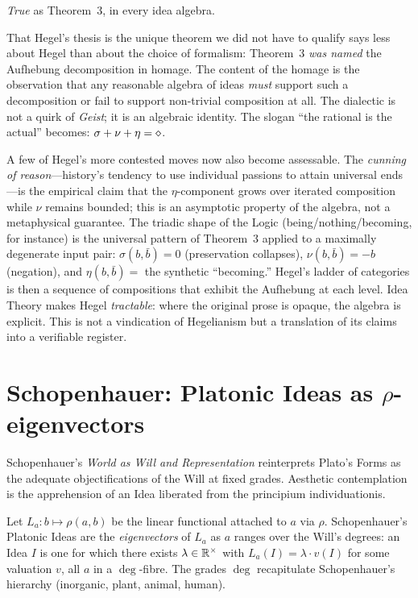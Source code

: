 \formalstatus \emph{True} as Theorem~3, in every idea algebra.

\litcomment That Hegel's thesis is the unique theorem we did not have to
qualify says less about Hegel than about the choice of formalism:
Theorem~3 \emph{was named} the Aufhebung decomposition in homage. The
content of the homage is the observation that any reasonable algebra of
ideas \emph{must} support such a decomposition or fail to support
non-trivial composition at all. The dialectic is not a quirk of
\emph{Geist}; it is an algebraic identity. The slogan ``the rational is
the actual'' becomes: $\sigma + \nu + \eta = \mathbin{\diamond}$.

A few of Hegel's more contested moves now also become assessable.
The \emph{cunning of reason}---history's tendency to use individual
passions to attain universal ends---is the empirical claim that the
$\eta$-component grows over iterated composition while $\nu$ remains
bounded; this is an asymptotic property of the algebra, not a
metaphysical guarantee. The triadic shape of the Logic
(being/nothing/becoming, for instance) is the universal pattern of
Theorem~3 applied to a maximally degenerate input pair: $\sigma(b,
\bar b) = 0$ (preservation collapses), $\nu(b, \bar b) = -b$
(negation), and $\eta(b, \bar b) = $ the synthetic ``becoming.''
Hegel's ladder of categories is then a sequence of compositions that
exhibit the Aufhebung at each level. Idea Theory makes Hegel
\emph{tractable}: where the original prose is opaque, the algebra is
explicit. This is not a vindication of Hegelianism but a translation
of its claims into a verifiable register.

\section{Schopenhauer: Platonic Ideas as $\rho$-eigenvectors}\label{sec:schopenhauer}

 Schopenhauer's \emph{World as Will and
Representation} \cite{Schopenhauer1819} reinterprets Plato's Forms as the
adequate objectifications of the Will at fixed grades. Aesthetic
contemplation is the apprehension of an Idea liberated from the
principium individuationis.

\formalclaim Let $L_a:b\mapsto \rho(a, b)$ be the linear functional
attached to $a$ via $\rho$. Schopenhauer's Platonic Ideas are the
\emph{eigenvectors} of $L_a$ as $a$ ranges over the Will's degrees: an
Idea $I$ is one for which there exists $\lambda\in\mathbb{R}^{\times}$ with
$L_a(I) = \lambda\cdot v(I)$ for some valuation $v$, all $a$ in a
$\deg$-fibre. The grades $\deg$ recapitulate Schopenhauer's hierarchy
(inorganic, plant, animal, human).

